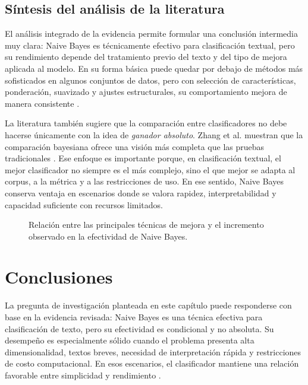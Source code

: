 \subsection{Síntesis del análisis de la literatura}

El análisis integrado de la evidencia permite formular una conclusión intermedia muy clara: Naive Bayes es técnicamente efectivo para clasificación textual, pero su rendimiento depende del tratamiento previo del texto y del tipo de mejora aplicada al modelo. En su forma básica puede quedar por debajo de métodos más sofisticados en algunos conjuntos de datos, pero con selección de características, ponderación, suavizado y ajustes estructurales, su comportamiento mejora de manera consistente \cite{Kim2006,Frank2006,Jiang2016,ZHANG2016137,Tang20162508}.

La literatura también sugiere que la comparación entre clasificadores no debe hacerse únicamente con la idea de \textit{ganador absoluto}. Zhang et al. muestran que la comparación bayesiana ofrece una visión más completa que las pruebas tradicionales \cite{10.1145/2911451.2911547}. Ese enfoque es importante porque, en clasificación textual, el mejor clasificador no siempre es el más complejo, sino el que mejor se adapta al corpus, a la métrica y a las restricciones de uso. En ese sentido, Naive Bayes conserva ventaja en escenarios donde se valora rapidez, interpretabilidad y capacidad suficiente con recursos limitados.

\begin{figure}[H]
\centering
{}
\caption{Relación entre las principales técnicas de mejora y el incremento observado en la efectividad de Naive Bayes.}
\label{fig:relacion_mejoras}
\end{figure}

\section{Conclusiones}

La pregunta de investigación planteada en este capítulo puede responderse con base en la evidencia revisada: Naive Bayes es una técnica efectiva para clasificación de texto, pero su efectividad es condicional y no absoluta. Su desempeño es especialmente sólido cuando el problema presenta alta dimensionalidad, textos breves, necesidad de interpretación rápida y restricciones de costo computacional. En esos escenarios, el clasificador mantiene una relación favorable entre simplicidad y rendimiento \cite{Kim2006,Frank2006,Sangounpao2019,Awotunde2023131}.

